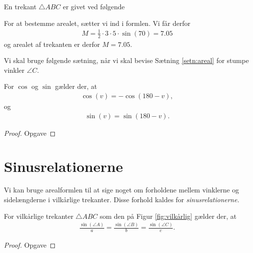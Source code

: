 \begin{exa}
En trekant $\triangle ABC$ er givet ved følgende
\begin{center}
\end{center}
For at bestemme arealet, sætter vi ind i formlen. Vi får derfor
\begin{align*}
	M = \frac{1}{2}\cdot 3 \cdot 5 \cdot \sin(70) = 7.05
\end{align*}
og arealet af trekanten er derfor $M = 7.05$.
\end{exa}

Vi skal bruge følgende sætning, når vi skal bevise Sætning \ref{setn:areal} for stumpe vinkler $\angle C$.
\begin{setn}
	\label{setn:cossin}
	For $\cos$ og $\sin$ gælder der, at 
	\begin{align*}
		\cos(v) = -\cos(180 - v),
	\end{align*}
	og
	\begin{align*}
		\sin(v) = \sin(180 - v).
	\end{align*}
\end{setn} 
\begin{proof}
	Opgave
\end{proof}

\section*{Sinusrelationerne}

Vi kan bruge arealformlen til at sige noget om forholdene mellem vinklerne og sidelængderne i vilkårlige trekanter. Disse forhold kaldes for \textit{sinusrelationerne.}
\begin{setn}[Sinusrelationerne]
	\label{setn:sinusrelation}
	For vilkårlige trekanter $\triangle ABC$ som den på Figur \ref{fig:vilkårlig} gælder der, at 
	\begin{align*}
		\frac{\sin(\angle A)}{a} = \frac{\sin(\angle B)}{b} = \frac{\sin(\angle C)}{c}.
	\end{align*}
\end{setn}
\begin{proof}
	Opgave
\end{proof}

